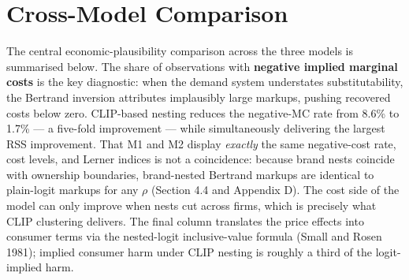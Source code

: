 \section{Cross-Model Comparison}\label{cross-model-comparison}

The central economic-plausibility comparison across the three models is
summarised below. The share of observations with \textbf{negative
implied marginal costs} is the key diagnostic: when the demand system
understates substitutability, the Bertrand inversion attributes
implausibly large markups, pushing recovered costs below zero.
CLIP-based nesting reduces the negative-MC rate from 8.6\% to 1.7\% ---
a five-fold improvement --- while simultaneously delivering the largest
RSS improvement. That M1 and M2 display \emph{exactly} the same
negative-cost rate, cost levels, and Lerner indices is not a
coincidence: because brand nests coincide with ownership boundaries,
brand-nested Bertrand markups are identical to plain-logit markups for
any \(\rho\) (Section 4.4 and Appendix D). The cost side of the model
can only improve when nests cut across firms, which is precisely what
CLIP clustering delivers. The final column translates the price effects
into consumer terms via the nested-logit inclusive-value formula (Small
and Rosen 1981); implied consumer harm under CLIP nesting is roughly a
third of the logit-implied harm.

